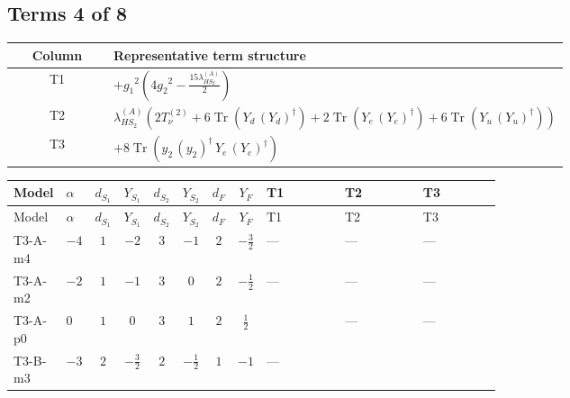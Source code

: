 \documentclass[8pt]{article}
\begin{document}
\begin{landscape}
\subsection*{Terms 4 of 8}
\begin{center}
\begin{tabular}{@{}c >{\raggedright\arraybackslash}p{0.82\linewidth}@{}}
\toprule
Column & Representative term structure \\
\midrule
T1 & \(\displaystyle +{g_1}^2 \left(4 {g_2}^2-\frac{15 {\lambda_{HS_2}^{(A)}}}{2}\right)\) \\
\midrule
T2 & \(\displaystyle {\lambda_{HS_2}^{(A)}} (2 T_{\nu}^{(2)}+6 \operatorname{Tr}\!\left({Y_d}\,\left({Y_d}\right)^{\dagger}\right)+2 \operatorname{Tr}\!\left({Y_e}\,\left({Y_e}\right)^{\dagger}\right)+6 \operatorname{Tr}\!\left({Y_u}\,\left({Y_u}\right)^{\dagger}\right))\) \\
\midrule
T3 & \(\displaystyle +8 \operatorname{Tr}\!\left({y_2}\,\left({y_2}\right)^{\dagger}\,{Y_e}\,\left({Y_e}\right)^{\dagger}\right)\) \\
\midrule
\bottomrule
\end{tabular}
\end{center}
\smallskip
\tiny
\begin{longtable}{@{}llcccccc >{\raggedright\arraybackslash}p{0.21\linewidth} >{\raggedright\arraybackslash}p{0.21\linewidth} >{\raggedright\arraybackslash}p{0.21\linewidth}@{}}
\toprule
Model & $\alpha$ & $d_{S_1}$ & $Y_{S_1}$ & $d_{S_2}$ & $Y_{S_2}$ & $d_F$ & $Y_F$ & T1 & T2 & T3 \\
\midrule
\endfirsthead
\toprule
Model & $\alpha$ & $d_{S_1}$ & $Y_{S_1}$ & $d_{S_2}$ & $Y_{S_2}$ & $d_F$ & $Y_F$ & T1 & T2 & T3 \\
\midrule
\endhead
T3-A-m4 & $-4$ & $1$ & $-2$ & $3$ & $-1$ & $2$ & $-\frac{3}{2}$ & --- & --- & --- \\
\midrule
T3-A-m2 & $-2$ & $1$ & $-1$ & $3$ & $0$ & $2$ & $-\frac{1}{2}$ & --- & --- & --- \\
\midrule
T3-A-p0 & $0$ & $1$ & $0$ & $3$ & $1$ & $2$ & $\frac{1}{2}$ & \scriptsize\adjustbox{max width=\linewidth}{$\begin{gathered} +{g_1}^2 \left(4 {g_2}^2-\frac{15 {\lambda_{HS_2}^{(A)}}}{2}\right)\end{gathered}$} & --- & --- \\
\midrule
T3-B-m3 & $-3$ & $2$ & $-\frac{3}{2}$ & $2$ & $-\frac{1}{2}$ & $1$ & $-1$ & --- & \scriptsize\adjustbox{max width=\linewidth}{$\begin{gathered} {\lambda_{HS_2}^{(A)}} (2 T_{\nu}^{(2)}+6 \operatorname{Tr}\!\left({Y_d}\,\left({Y_d}\right)^{\dagger}\right)+2 \operatorname{Tr}\!\left({Y_e}\,\left({Y_e}\right)^{\dagger}\right)+6 \operatorname{Tr}\!\left({Y_u}\,\left({Y_u}\right)^{\dagger}\right))\end{gathered}$} & \scriptsize\adjustbox{max width=\linewidth}{$\begin{gathered} +8 \operatorname{Tr}\!\left({y_2}\,\left({y_2}\right)^{\dagger}\,{Y_e}\,\left({Y_e}\right)^{\dagger}\right)\end{gathered}$} \\

\end{longtable}
\end{landscape}
\end{document}
